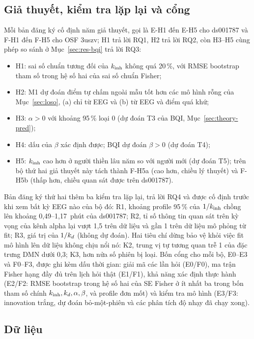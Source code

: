 \subsection{Giả thuyết, kiểm tra lặp lại và cổng}
\label{sec:hyp}
Mỗi bản đăng ký cố định năm giả thuyết, gọi là E-H1 đến E-H5 cho ds001787 và F-H1 đến F-H5 cho OSF 3uszv; H1 trả lời RQ1, H2 trả lời RQ2, còn H3--H5 cùng phép so sánh ở Mục~\ref{sec:res-bqi} trả lời RQ3:
\begin{itemize}
  \item H1: sai số chuẩn tương đối của $k_{\mathrm{inh}}$ không quá 20\,\%, với RMSE bootstrap tham số trong hệ số hai của sai số chuẩn Fisher;
  \item H2: M1 dự đoán điểm tự chấm ngoài mẫu tốt hơn các mô hình rỗng của Mục~\ref{sec:loso}, (a) chỉ từ EEG và (b) từ EEG và điểm quá khứ;
  \item H3: $\alpha>0$ với khoảng 95\,\% loại 0 (dự đoán T3 của BQI, Mục~\ref{sec:theory-pred});
  \item H4: dấu của $\beta$ xác định được; BQI dự đoán $\beta>0$ (dự đoán T4);
  \item H5: $k_{\mathrm{inh}}$ cao hơn ở người thiền lâu năm so với người mới (dự đoán T5); trên bộ thứ hai giả thuyết này tách thành F-H5a (cao hơn, chiều lý thuyết) và F-H5b (thấp hơn, chiều quan sát được trên ds001787).
\end{itemize}
Bản đăng ký thứ hai thêm ba kiểm tra lặp lại, trả lời RQ4 và được cố định trước khi xem bất kỳ EEG nào của bộ đó: R1, khoảng profile 95\,\% của $1/k_{\mathrm{inh}}$ chồng lên khoảng 0,49--1,17~phút của ds001787; R2, tỉ số thông tin quan sát trên kỳ vọng của kênh alpha lại vượt 1,5 trên dữ liệu và gần 1 trên dữ liệu mô phỏng từ fit; R3, giá trị của $1/k_{d}$ (không dự đoán). Hai tiêu chí dừng bảo vệ khỏi việc fit mô hình lên dữ liệu không chịu nổi nó: K2, trung vị tự tương quan trễ 1 của đặc trưng DMN dưới 0,3; K3, hơn nửa số phiên bị loại. Bốn cổng cho mỗi bộ, E0--E3 và F0--F3, được ghi kèm dấu thời gian: giải mã các lần hỏi (E0/F0), ma trận Fisher hạng đầy đủ trên lịch hỏi thật (E1/F1), khả năng xác định thực hành (E2/F2: RMSE bootstrap trong hệ số hai của SE Fisher ở ít nhất ba trong bốn tham số chính $k_{\mathrm{inh}},k_{d},\alpha,\beta$, và profile đơn mốt) và kiểm tra mô hình (E3/F3: innovation trắng, dự đoán bỏ-một-phiên và các phân tích độ nhạy đã chạy xong).

\subsection{Dữ liệu}
\label{sec:data}

